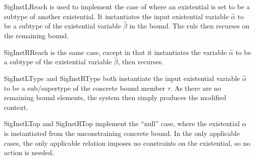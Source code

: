 \documentclass{sig-alternate}
\begin{document}
SigInstLReach is used to implement the case of where an existential is set to be a subtype of another existential. It instantiates the input existential variable $\hat{\alpha}$ to be a subtype of the existential variable $\hat{\beta}$ in the bound. The rule then recurses on the remaining bound.

SigInstRReach is the same case, except in that it instantiates the variable $\hat{\alpha}$ to be a subtype of the existential variable $\hat{\beta}$, then recurses.

SigInstLType and SigInstRType both instantiate the input existential variable $\hat{\alpha}$ to be a sub/supertype of the concrete bound member $\tau$. As there are no remaining bound elements, the system then simply produces the modified context.

SigInstLTop and SigInstRTop implement the ``null'' case, where the existential $\hat{\alpha}$ is instantiated from the unconstraining concrete bound. In the only applicable cases, the only applicable relation imposes no constraints on the existential, so no action is needed.
\end{document}
